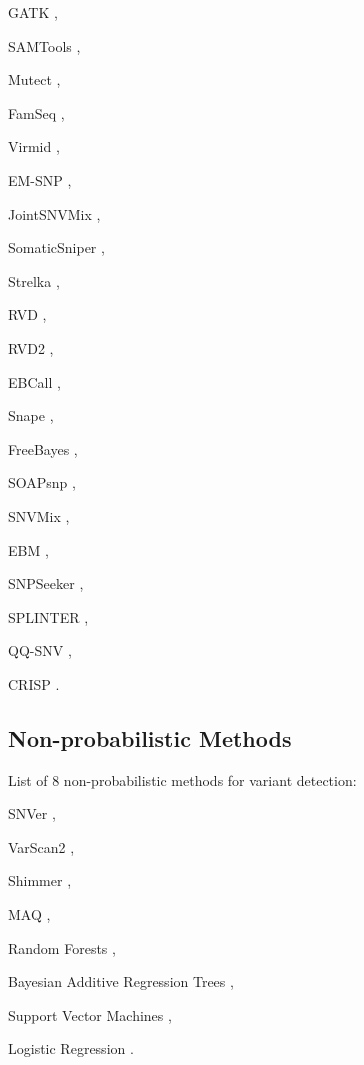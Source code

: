\documentclass[11pt,reqno]{amsart}
\begin{document}
GATK \citep{McKenna2010},

SAMTools \citep{Li2009a},

Mutect \citep{Cibulskis2013},

FamSeq \citep{Peng2013},

Virmid \citep{Kim2013},

EM-SNP \citep{Chen2013},

JointSNVMix \citep{Roth2012},

SomaticSniper \citep{Larson2012},

Strelka \citep{Saunders2012},

RVD \citep{Flaherty2012},

RVD2 \citep{He2015},

EBCall \citep{Shiraishi2013},

Snape \citep{Raineri2012},

FreeBayes \citep{Garrison2012},

SOAPsnp \citep{Li2009},

SNVMix \citep{Goya2010},

EBM \citep{Zhou2012},

SNPSeeker \citep{Druley2009},

SPLINTER \citep{Spencer2014},

QQ-SNV \citep{VanderBorght2015},

CRISP \citep{Bansal2010}.

\subsection{Non-probabilistic Methods}
List of 8 non-probabilistic methods for variant detection:

SNVer \citep{Wei2011},

VarScan2 \citep{Koboldt2012},

Shimmer \citep{Hansen2013},

MAQ \citep{Li2008},

Random Forests \citep{Ding2012},

Bayesian Additive Regression Trees \citep{Ding2012},

Support Vector Machines \citep{Ding2012},

Logistic Regression \citep{Ding2012}.




\end{document}
